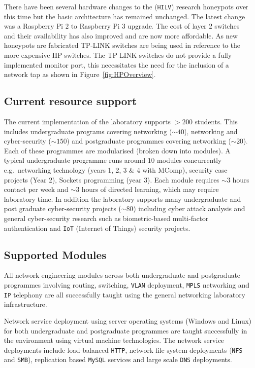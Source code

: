 There have been several hardware changes to the (\texttt{HILV}) research
honeypots over this time but the basic architecture has remained unchanged. The
latest change was a Raspberry Pi 2 to Raspberry Pi 3 upgrade. The cost of layer
2 switches and their availability has also improved and are now more
affordable. As new honeypots are fabricated TP-LINK switches are being used in
reference to the more expensive HP switches. The TP-LINK switches do not
provide a fully implemented monitor port, this necessitates the need for the
inclusion of a network tap as shown in Figure~\ref{fig:HPOverview}.

\subsection{Current resource support}\label{ResourceSupport}

The current implementation of the laboratory supports $>200$ students. This
includes undergraduate programs covering networking ($\sim40$), networking and
cyber-security ($\sim150$) and postgraduate programmes covering networking
($\sim20$). Each of these programmes are modularised (broken down into
modules).  A typical undergraduate programme runs around $10$ modules
concurrently e.g.\ networking technology (years 1, 2, 3 \& 4 with MComp),
security case projects (Year 2), Sockets programming (year 3). Each module
requires $\sim3$ hours contact per week and $\sim3$ hours of directed learning,
which may require laboratory time. In addition the laboratory supports many
undergraduate and post graduate cyber-security projects ($\sim80$) including
cyber attack analysis and general cyber-security research such as
biometric-based multi-factor authentication and \texttt{IoT} (Internet of
Things) security projects.

\subsection{Supported Modules}\label{Modules}

All network engineering modules across both undergraduate and postgraduate
programmes involving routing, switching, \texttt{VLAN} deployment,
\texttt{MPLS} networking and \texttt{IP} telephony are all successfully taught
using the general networking laboratory infrastructure.

Network service deployment using server operating systems (Windows and Linux)
for both undergraduate and postgraduate programmes are taught successfully in
the environment using virtual machine technologies. The network service
deployments include load-balanced \texttt{HTTP}, network file system
deployments (\texttt{NFS} and \texttt{SMB}), replication based \texttt{MySQL}
services and large scale \texttt{DNS} deployments.


